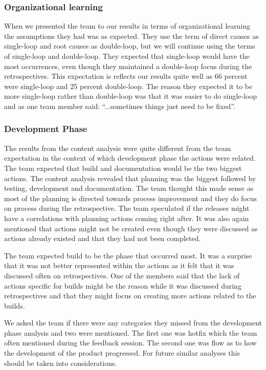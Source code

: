 \subsubsection{Organizational learning}
When we presented the team to our results in terms of organizational learning the assumptions they had was as expected. They use the term of direct causes as single-loop and root causes as double-loop, but we will continue using the terms of single-loop and double-loop. They expected that single-loop would have the most occurrences, even though they maintained a double-loop focus during the retrospectives. This expectation is reflects our results quite well as 66 percent were single-loop and 25 percent double-loop. The reason they expected it to be more single-loop rather than double-loop was that it was easier to do single-loop and as one team member said: ``...sometimes things just need to be fixed''. 

\subsubsection{Development Phase}
The results from the content analysis were quite different from the team expectation in the context of which development phase the actions were related. The team expected that build and documentation would be the two biggest actions. The content analysis revealed that planning was the biggest followed by testing, development and documentation. The team thought this made sense as most of the planning is directed towards process improvement and they do focus on process during the retrospective. The team speculated if the releases might have a correlations with planning actions coming right after. It was also again mentioned that actions might not be created even though they were discussed as actions already existed and that they had not been completed. 

The team expected build to be the phase that occurred most. It was a surprise that it was not better represented within the actions as it felt that it was discussed often on retrospectives. One of the members said that the lack of actions specific for builds might be the reason while it was discussed during retrospectives and that they might focus on creating more actions related to the builds. 

We asked the team if there were any categories they missed from the development phase analysis and two were mentioned. The first one was hotfix which the team often mentioned during the feedback session. The second one was flow as to how the development of the product progressed. For future similar analyses this should be taken into considerations. 

